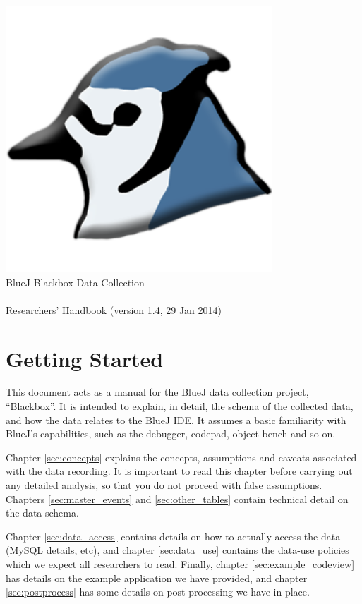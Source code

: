 \documentclass{report}
\begin{document}
\begin{titlepage}
  \begin{center}
    \includegraphics[width=10cm]{../../lib/images/bluej-icon-256.png}\\
    \huge BlueJ Blackbox Data Collection\\~\\Researchers' Handbook
    (version 1.4, 29 Jan 2014)
  \end{center}
\end{titlepage}

\section*{Getting Started}

This document acts as a manual for the BlueJ data collection project,
``Blackbox''.  It is intended to explain, in detail, the schema of the
collected data, and how the data relates to the BlueJ IDE.  It assumes a basic
familiarity with BlueJ's capabilities, such as the debugger, codepad, object
bench and so on.

Chapter \ref{sec:concepts} explains the concepts, assumptions and caveats
associated with the data recording.  It is important to read this chapter
before carrying out any detailed analysis, so that you do not proceed with
false assumptions.  Chapters \ref{sec:master_events} and
\ref{sec:other_tables} contain technical detail on the data schema.

Chapter \ref{sec:data_access} contains details on how to actually access the
data (MySQL details, etc), and chapter \ref{sec:data_use} contains the
data-use policies which we expect all researchers to read.  Finally, chapter
\ref{sec:example_codeview} has details on the example application we have
provided, and chapter \ref{sec:postprocess} has some details on
post-processing we have in place.
\end{document}

